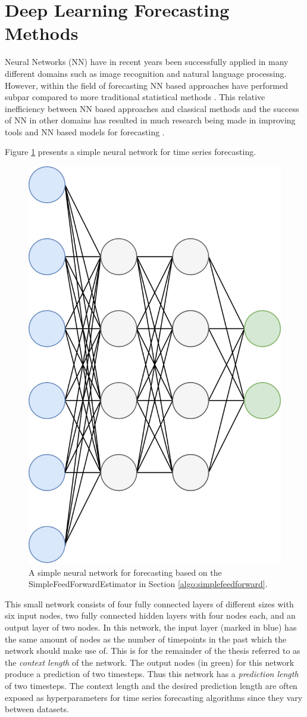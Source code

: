 \section{Deep Learning Forecasting Methods}
\label{sec:deep_learning_methods}
Neural Networks (NN) have in recent years been successfully applied in many different domains such as image recognition and natural language processing. However, within the field of forecasting NN based approaches have performed subpar compared to more traditional statistical methods \cite{m3_competition,makridakis_m4_2020,oreshkin_n_beats_2020, other_thesis}. This relative inefficiency between NN based approaches and classical methods and the success of NN in other domains has resulted in much research being made in improving tools and NN based models for forecasting \cite{gluonts_paper}.

Figure \ref{fig:simplefeedforward} presents a simple neural network for time series forecasting.

\begin{figure}[htb]
  \centering
  \includegraphics[width=0.5\linewidth]{./img/simplefeedforward.png}
  \caption{A simple neural network for forecasting based on the SimpleFeedForwardEstimator in Section \ref{algo:simplefeedforward}.}
  \label{fig:simplefeedforward}
\end{figure}

This small network consists of four fully connected layers of different sizes with six input nodes, two fully connected hidden layers with four nodes each, and an output layer of two nodes. In this network, the input layer (marked in blue) has the same amount of nodes as the number of timepoints in the past which the network should make use of. This is for the remainder of the thesis referred to as the \textit{context length} of the network. The output nodes (in green) for this network produce a prediction of two timesteps. Thus this network has a \textit{prediction length} of two timesteps. The context length and the desired prediction length are often exposed as hyperparameters for time series forecasting algorithms since they vary between datasets.

